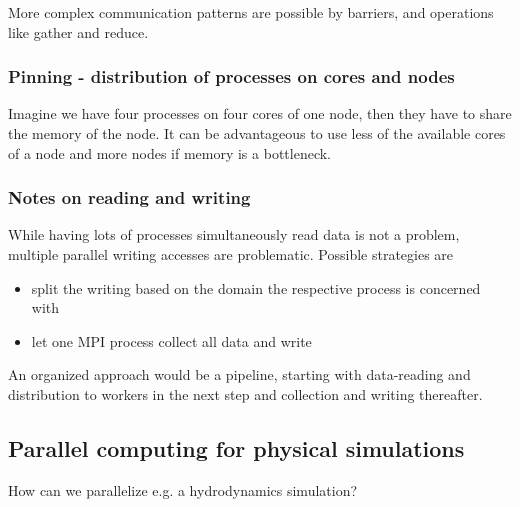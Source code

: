 More complex communication patterns are possible by barriers, and operations
like gather and reduce.

\subsubsection{Pinning - distribution of processes on cores and nodes}
Imagine we have four processes on four cores of one node, then they have to share
the memory of the node. It can be advantageous to use less of the available cores
of a node and more nodes if memory is a bottleneck.

\subsubsection{Notes on reading and writing}
While having lots of processes simultaneously read data is not a problem, \textcolor{red1}{multiple parallel writing
accesses} are problematic. Possible strategies are
\begin{itemize}
    \item split the writing based on the domain the respective process is concerned with
    \item let one MPI process collect all data and write
\end{itemize}
An organized approach would be a pipeline, starting with data-reading and
distribution to workers in the next step and collection and writing thereafter.

\subsection{Parallel computing for physical simulations}
How can we parallelize e.g. a hydrodynamics simulation?

